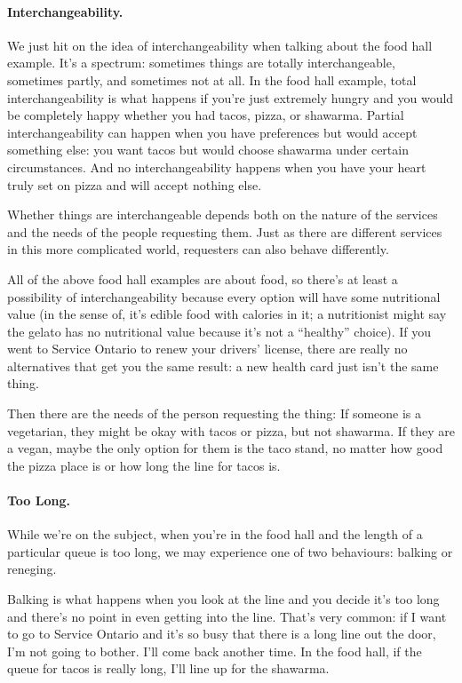 \paragraph{Interchangeability.} We just hit on the idea of interchangeability when talking about the food hall example. It's a spectrum: sometimes things are totally interchangeable, sometimes partly, and sometimes not at all. In the food hall example, total interchangeability is what happens if you're just extremely hungry and you would be completely happy whether you had tacos, pizza, or shawarma.  Partial interchangeability can happen when you have preferences but would accept something else: you want tacos but would choose shawarma under certain circumstances. And no interchangeability happens when you have your heart truly set on pizza and will accept nothing else.

Whether things are interchangeable depends both on the nature of the services and the needs of the people requesting them. Just as there are different services in this more complicated world, requesters can also behave differently.

All of the above food hall examples are about food, so there's at least a possibility of interchangeability because every option will have some nutritional value (in the sense of, it's edible food with calories in it; a nutritionist might say the gelato has no nutritional value because it's not a ``healthy'' choice). If you went to Service Ontario to renew your drivers' license, there are really no alternatives that get you the same result: a new health card just isn't the same thing.

Then there are the needs of the person requesting the thing:  If someone is a vegetarian, they might be okay with tacos or pizza, but not shawarma. If they are a vegan, maybe the only option for them is the taco stand, no matter how good the pizza place is or how long the line for tacos is.

\paragraph{Too Long.} 
While we're on the subject, when you're in the food hall and the length of a particular queue is too long, we may experience one of two behaviours: balking or reneging. 

Balking is what happens when you look at the line and you decide it's too long and there's no point in even getting into the line. That's very common: if I want to go to Service Ontario and it's so busy that there is a long line out the door, I'm not going to bother. I'll come back another time. In the food hall, if the queue for tacos is really long, I'll line up for the shawarma. 

